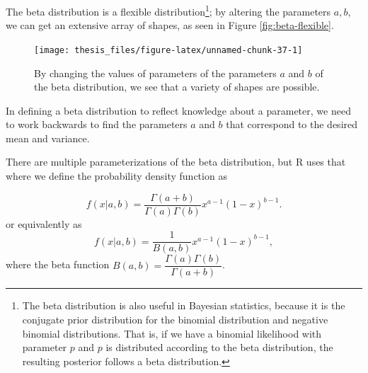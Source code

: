 \documentclass[12pt,twoside]{smiththesis}
\begin{document}
The beta distribution is a flexible distribution\footnote{The beta distribution is also useful in Bayesian statistics, because it is the conjugate prior distribution for the binomial distribution and negative binomial distributions. That is, if we have a binomial likelihood with parameter \(p\) and \(p\) is distributed according to the beta distribution, the resulting posterior follows a beta distribution.}; by altering the parameters \(a,b\), we can get an extensive array of shapes, as seen in Figure \ref{fig:beta-flexible}.
\begin{figure}

{\centering \texttt{[image: thesis\_files/figure-latex/unnamed-chunk-37-1]} 

}

\caption{\label{fig:beta-flexible}By changing the values of parameters of the parameters $a$ and $b$ of the beta distribution, we see that a variety of shapes are possible.}\label{fig:unnamed-chunk-37}
\end{figure}
In defining a beta distribution to reflect knowledge about a parameter, we need to work backwards to find the parameters \(a\) and \(b\) that correspond to the desired mean and variance.

There are multiple parameterizations of the beta distribution, but R uses that where we define the probability density function as

\[
f(x|a,b) = \dfrac{\Gamma(a + b)}{\Gamma(a) \Gamma(b)} x^{a - 1} (1-x)^{b - 1}.
\]
or equivalently as
\[
f(x|a,b) = \dfrac{1}{B(a,b)} x^{a - 1} (1-x)^{b - 1},
\]
where the beta function \(B(a, b) = \dfrac{\Gamma(a)\Gamma(b) }{\Gamma ( a + b)}\).
\end{document}
